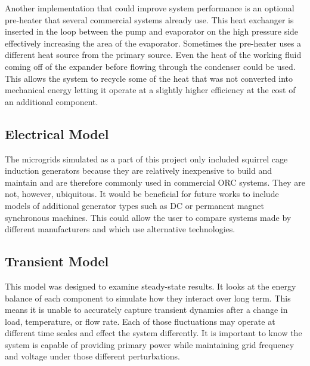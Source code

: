 Another implementation that could improve system performance is an optional pre-heater that several commercial systems already use. This heat exchanger is inserted in the loop between the pump and evaporator on the high pressure side effectively increasing the area of the evaporator. Sometimes the pre-heater uses a different heat source from the primary source. Even the heat of the working fluid coming off of the expander before flowing through the condenser could be used. This allows the system to recycle some of the heat that was not converted into mechanical energy letting it operate at a slightly higher efficiency at the cost of an additional component.

\subsection{Electrical Model}
The microgrids simulated as a part of this project only included squirrel cage induction generators because they are relatively inexpensive to build and maintain and are therefore commonly used in commercial ORC systems. They are not, however, ubiquitous. It would be beneficial for future works to include models of additional generator types such as DC or permanent magnet synchronous machines. This could allow the user to compare systems made by different manufacturers and which use alternative technologies.

\subsection{Transient Model}
This model was designed to examine steady-state results. It looks at the energy balance of each component to simulate how they interact over long term. This means it is unable to accurately capture transient dynamics after a change in load, temperature, or flow rate. Each of those fluctuations may operate at different time scales and effect the system differently. It is important to know the system is capable of providing primary power while maintaining grid frequency and voltage under those different perturbations.
